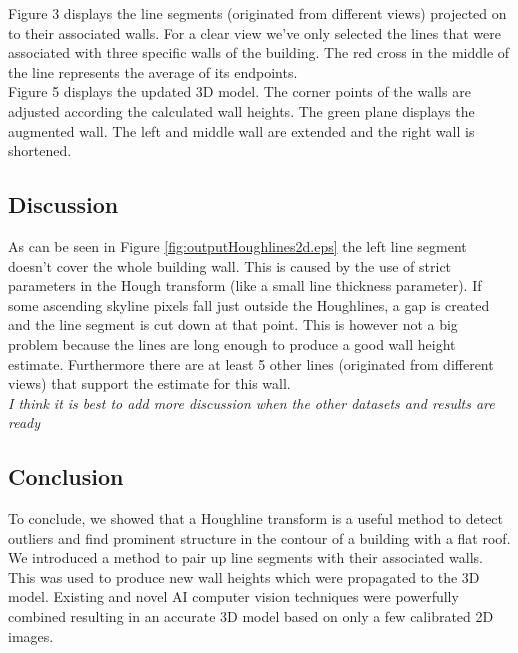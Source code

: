 \documentclass[10pt]{article}
\begin{document}
Figure %
3 displays the line segments (originated from
different views) projected on to their associated walls.  For a clear view we've
only selected the lines that were associated with three specific walls of the building.  
The red cross in the middle of the line represents the average of its endpoints.\\

Figure 5 %
displays the updated 3D model. The
corner points of the walls are adjusted according the calculated wall heights.
The green plane displays the augmented wall. The left and middle wall are extended
and the right wall is shortened.\\


\subsection{Discussion}
As can be seen in Figure
\ref{fig:outputHoughlines2d.eps} the left line segment doesn't cover the whole
building wall. This is caused by the use of strict parameters in the Hough transform
(like a small line thickness parameter).  If some ascending skyline pixels fall just outside
the Houghlines, a gap is created and the line segment is cut down at that point.
This is however not a big problem because the lines are long enough to produce a
good wall height estimate. Furthermore there are at least 5 other lines
(originated from different views) that support the estimate for this wall.\\
\emph{I think it is best to add more discussion when the other datasets and results are ready}




\subsection{Conclusion}


To conclude, we showed that a Houghline transform is a useful method to detect outliers and find prominent structure in the contour of a building with a flat roof. We introduced a method to pair up line segments with their associated walls. This was used to produce new wall heights which were propagated to the 3D model.
Existing and novel AI computer vision techniques were powerfully combined resulting in an accurate 3D model based on only a few calibrated 2D images. 
\end{document}
